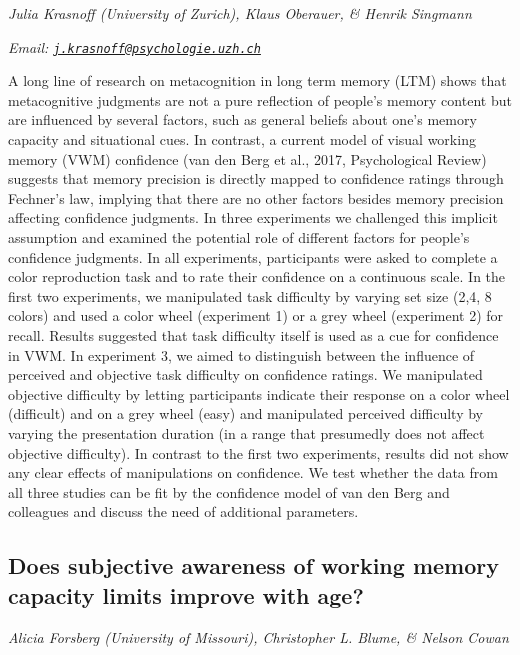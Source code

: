 \documentclass[
  12pt,
]{book}
\begin{document}
\emph{Julia Krasnoff (University of Zurich), Klaus Oberauer, \& Henrik Singmann}

\emph{Email: \href{mailto:j.krasnoff@psychologie.uzh.ch}{\nolinkurl{j.krasnoff@psychologie.uzh.ch}}}

A long line of research on metacognition in long term memory (LTM) shows that metacognitive judgments are not a pure reflection of people's memory content but are influenced by several factors, such as general beliefs about one's memory capacity and situational cues. In contrast, a current model of visual working memory (VWM) confidence (van den Berg et al., 2017, Psychological Review) suggests that memory precision is directly mapped to confidence ratings through Fechner's law, implying that there are no other factors besides memory precision affecting confidence judgments. In three experiments we challenged this implicit assumption and examined the potential role of different factors for people's confidence judgments. In all experiments, participants were asked to complete a color reproduction task and to rate their confidence on a continuous scale. In the first two experiments, we manipulated task difficulty by varying set size (2,4, 8 colors) and used a color wheel (experiment 1) or a grey wheel (experiment 2) for recall. Results suggested that task difficulty itself is used as a cue for confidence in VWM. In experiment 3, we aimed to distinguish between the influence of perceived and objective task difficulty on confidence ratings. We manipulated objective difficulty by letting participants indicate their response on a color wheel (difficult) and on a grey wheel (easy) and manipulated perceived difficulty by varying the presentation duration (in a range that presumedly does not affect objective difficulty). In contrast to the first two experiments, results did not show any clear effects of manipulations on confidence. We test whether the data from all three studies can be fit by the confidence model of van den Berg and colleagues and discuss the need of additional parameters.

\hypertarget{does-subjective-awareness-of-working-memory-capacity-limits-improve-with-age}{%
\subsection{Does subjective awareness of working memory capacity limits improve with age?}\label{does-subjective-awareness-of-working-memory-capacity-limits-improve-with-age}}

\emph{Alicia Forsberg (University of Missouri), Christopher L. Blume, \& Nelson Cowan}
\end{document}
